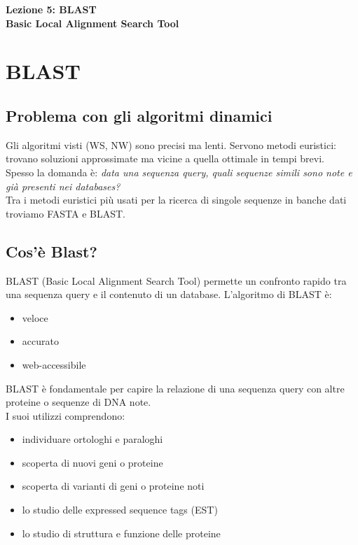 \documentclass{article}
\begin{document}
\begin{titlepage}
    \begin{center}
        \vspace*{1cm}
        \LARGE
        \textbf{Lezione 5: BLAST\\Basic Local Alignment Search Tool}

    \end{center}
\end{titlepage}
\setcounter{page}{45}

\section{BLAST}
\subsection{Problema con gli algoritmi dinamici}
Gli algoritmi visti (WS, NW) sono precisi ma lenti.
Servono metodi euristici: trovano soluzioni
approssimate ma vicine a quella ottimale in tempi
brevi.\\
Spesso la domanda è: \textit{data una sequenza query, quali
sequenze simili sono note e già presenti nei
databases?}\\
Tra i metodi euristici più usati per la ricerca di singole
sequenze in banche dati troviamo FASTA e BLAST.
\subsection{Cos'è Blast?}
BLAST (Basic Local Alignment Search Tool)
permette un confronto rapido tra una sequenza
query e il contenuto di un database.
L'algoritmo di BLAST è:
\begin{itemize}
    \item veloce
    \item accurato
    \item web-accessibile 
\end{itemize}
BLAST è fondamentale per capire la relazione di
una sequenza query con altre proteine o
sequenze di DNA note.\\
I suoi utilizzi comprendono:
\begin{itemize}
    \item individuare ortologhi e paraloghi
    \item scoperta di nuovi geni o proteine
    \item scoperta di varianti di geni o proteine noti
    \item lo studio delle expressed sequence tags (EST)
    \item lo studio di struttura e funzione delle proteine
\end{itemize}
\end{document}
